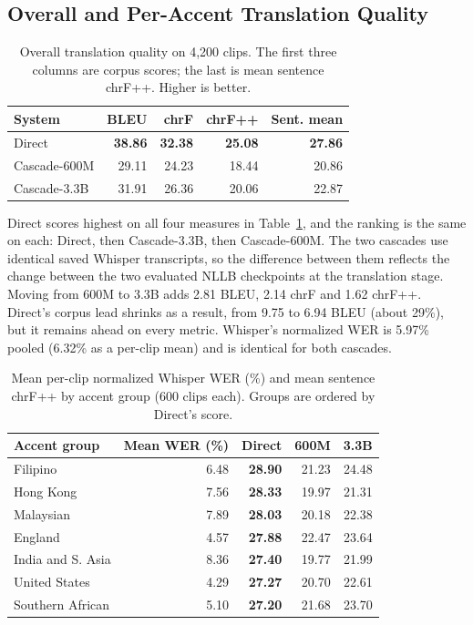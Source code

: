 \subsection{Overall and Per-Accent Translation Quality}
\label{sec:quality-results}

\begin{table}[t]
\caption{Overall translation quality on 4,200 clips. The first three
columns are corpus scores; the last is mean sentence chrF++. Higher is
better.}
\label{tab:overall}
\centering
\footnotesize
\begin{tabular}{@{}lrrrr@{}}
\toprule
System & BLEU & chrF & chrF++ & Sent. mean \\
\midrule
Direct       & \textbf{38.86} & \textbf{32.38} & \textbf{25.08} & \textbf{27.86} \\
Cascade-600M & 29.11 & 24.23 & 18.44 & 20.86 \\
Cascade-3.3B & 31.91 & 26.36 & 20.06 & 22.87 \\
\bottomrule
\end{tabular}
\end{table}

Direct scores highest on all four measures in Table~\ref{tab:overall},
and the ranking is the same on each: Direct, then Cascade-3.3B, then
Cascade-600M. The two cascades use identical saved Whisper transcripts, so
the difference between them reflects the change between the
two evaluated NLLB checkpoints at the translation stage. Moving from 600M to 3.3B adds 2.81 BLEU, 2.14 chrF and
1.62 chrF++. Direct's corpus lead shrinks as a result, from 9.75 to 6.94
BLEU (about 29\%), but it remains ahead on every metric. Whisper's
normalized WER is 5.97\% pooled (6.32\% as a per-clip mean) and is
identical for both cascades.

\begin{table}[t]
\caption{Mean per-clip normalized Whisper WER (\%) and mean sentence chrF++ by accent group
(600 clips each). Groups are ordered by Direct's score.}
\label{tab:accent}
\centering
\footnotesize
\begin{tabular}{@{}lrrrr@{}}
\toprule
Accent group & Mean WER (\%) & Direct & 600M & 3.3B \\
\midrule
Filipino             & 6.48 & \textbf{28.90} & 21.23 & 24.48 \\
Hong Kong            & 7.56 & \textbf{28.33} & 19.97 & 21.31 \\
Malaysian            & 7.89 & \textbf{28.03} & 20.18 & 22.38 \\
England              & 4.57 & \textbf{27.88} & 22.47 & 23.64 \\
India and S. Asia    & 8.36 & \textbf{27.40} & 19.77 & 21.99 \\
United States        & 4.29 & \textbf{27.27} & 20.70 & 22.61 \\
Southern African     & 5.10 & \textbf{27.20} & 21.68 & 23.70 \\
\bottomrule
\end{tabular}
\end{table}

